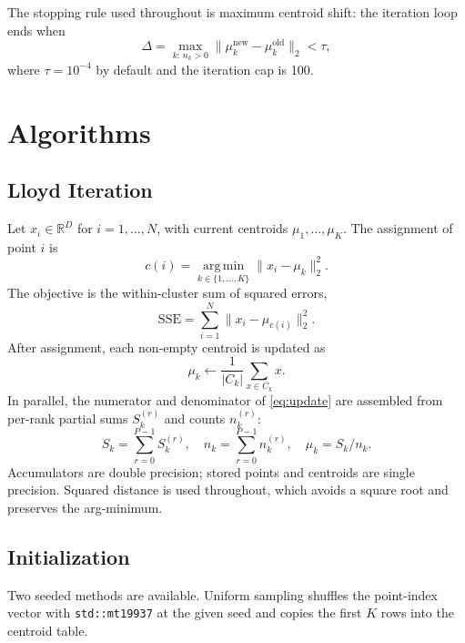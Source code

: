 \documentclass[12pt,a4paper]{article}
\DeclareRobustCommand{\code}[1]{\texttt{#1}}
\begin{document}
The stopping rule used throughout is maximum centroid shift: the iteration loop ends when
\[
  \Delta = \max_{k:\, n_k > 0}\big\|\mu_k^{\mathrm{new}} - \mu_k^{\mathrm{old}}\big\|_2 < \tau,
\]
where $\tau = 10^{-4}$ by default and the iteration cap is 100.

\section{Algorithms}
\label{sec:algorithms}

\subsection{Lloyd Iteration}

Let $x_i \in \mathbb{R}^{D}$ for $i = 1,\ldots,N$, with current centroids $\mu_1,\ldots,\mu_K$. The assignment of point $i$ is
\begin{equation}
  c(i) = \operatorname*{arg\,min}_{k \in \{1,\ldots,K\}}
           \big\| x_i - \mu_k \big\|_2^2 .
  \label{eq:assign}
\end{equation}
The objective is the within-cluster sum of squared errors,
\begin{equation}
  \mathrm{SSE} = \sum_{i=1}^{N} \big\| x_i - \mu_{c(i)} \big\|_2^2 .
  \label{eq:sse}
\end{equation}
After assignment, each non-empty centroid is updated as
\begin{equation}
  \mu_k \leftarrow \frac{1}{|C_k|} \sum_{x \in C_k} x .
  \label{eq:update}
\end{equation}
In parallel, the numerator and denominator of \eqref{eq:update} are assembled from per-rank partial sums $S_k^{(r)}$ and counts $n_k^{(r)}$:
\begin{equation}
  S_k = \sum_{r=0}^{P-1} S_k^{(r)}, \quad
  n_k = \sum_{r=0}^{P-1} n_k^{(r)}, \quad
  \mu_k = S_k / n_k .
  \label{eq:reduce}
\end{equation}
Accumulators are double precision; stored points and centroids are single precision. Squared distance is used throughout, which avoids a square root and preserves the arg-minimum.

\subsection{Initialization}

Two seeded methods are available. Uniform sampling shuffles the point-index vector with \code{std::mt19937} at the given seed and copies the first $K$ rows into the centroid table.
\end{document}
